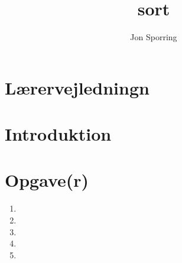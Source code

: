 \documentclass[a4paper,12pt]{article}
\title{sort}
\author{Jon Sporring}
\begin{document}
\maketitle

\section{Lærervejledningn}

\section{Introduktion}

\section{Opgave(r)}
\begin{enumerate}
\item 
\item 
\item 
\item 
\item 
\end{enumerate}
\end{document}
